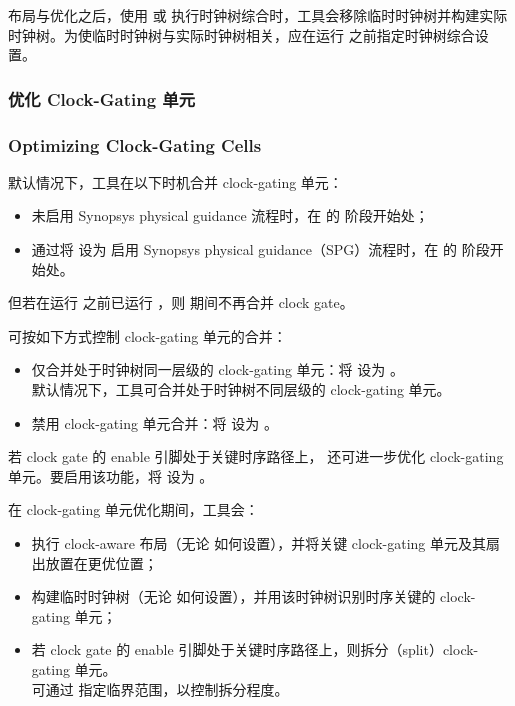 布局与优化之后，使用  或  执行时钟树综合时，工具会移除临时时钟树并构建实际时钟树。为使临时时钟树与实际时钟树相关，应在运行  之前指定时钟树综合设置。

\subsubsection{优化 Clock-Gating 单元}
\subsubsection*{Optimizing Clock-Gating Cells}

默认情况下，工具在以下时机合并 clock-gating 单元：
\begin{itemize}
  \item 未启用 Synopsys physical guidance 流程时，在  的  阶段开始处；
  \item 通过将  设为  启用 Synopsys physical guidance（SPG）流程时，在  的  阶段开始处。
\end{itemize}

但若在运行  之前已运行 ，则  期间不再合并 clock gate。

可按如下方式控制 clock-gating 单元的合并：
\begin{itemize}
  \item 仅合并处于时钟树同一层级的 clock-gating 单元：将  设为 。\\
        默认情况下，工具可合并处于时钟树不同层级的 clock-gating 单元。
  \item 禁用 clock-gating 单元合并：将  设为 。
\end{itemize}

若 clock gate 的 enable 引脚处于关键时序路径上， 还可进一步优化 clock-gating 单元。要启用该功能，将  设为 。

在 clock-gating 单元优化期间，工具会：
\begin{itemize}
  \item 执行 clock-aware 布局（无论  如何设置），并将关键 clock-gating 单元及其扇出放置在更优位置；
  \item 构建临时时钟树（无论  如何设置），并用该时钟树识别时序关键的 clock-gating 单元；
  \item 若 clock gate 的 enable 引脚处于关键时序路径上，则拆分（split）clock-gating 单元。\\
        可通过  指定临界范围，以控制拆分程度。
\end{itemize}

